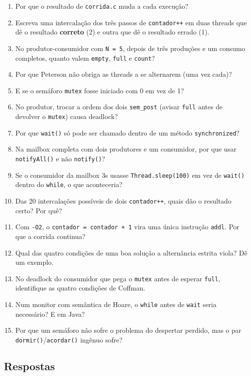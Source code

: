 \documentclass[11pt,a4paper]{article}
\newcommand{\cmd}[1]{\texttt{#1}}
\begin{document}
\begin{enumerate}
    \item Por que o resultado de \cmd{corrida.c} muda a cada execução?
    \item Escreva uma intercalação dos três passos de \cmd{contador++} em duas threads que dê o resultado \textbf{correto} (2) e outra que dê o resultado errado (1).
    \item No produtor-consumidor com \cmd{N = 5}, depois de três produções e um consumo completos, quanto valem \cmd{empty}, \cmd{full} e \cmd{count}?
    \item Por que Peterson não obriga as threads a se alternarem (uma vez cada)?
    \item E se o semáforo \cmd{mutex} fosse iniciado com 0 em vez de 1?
    \item No produtor, trocar a ordem dos dois \cmd{sem\_post} (avisar \cmd{full} antes de devolver o \cmd{mutex}) causa deadlock?
    \item Por que \cmd{wait()} só pode ser chamado dentro de um método \cmd{synchronized}?
    \item Na mailbox completa com dois produtores e um consumidor, por que usar \cmd{notifyAll()} e não \cmd{notify()}?
    \item Se o consumidor da mailbox 3s usasse \cmd{Thread.sleep(100)} em vez de \cmd{wait()} dentro do \cmd{while}, o que aconteceria?
    \item Das 20 intercalações possíveis de dois \cmd{contador++}, quais dão o resultado certo? Por quê?
    \item Com \cmd{-O2}, o \cmd{contador = contador + 1} vira uma única instrução \cmd{addl}. Por que a corrida continua?
    \item Qual das quatro condições de uma boa solução a alternância estrita viola? Dê um exemplo.
    \item No deadlock do consumidor que pega o \cmd{mutex} antes de esperar \cmd{full}, identifique as quatro condições de Coffman.
    \item Num monitor com semântica de Hoare, o \cmd{while} antes de \cmd{wait} seria necessário? E em Java?
    \item Por que um semáforo não sofre o problema do despertar perdido, mas o par \cmd{dormir()}/\cmd{acordar()} ingênuo sofre?
\end{enumerate}

\subsection*{Respostas}
\end{document}
